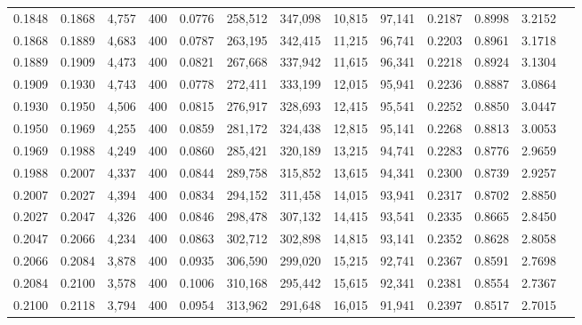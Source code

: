 \begin{tabular}{rrrrrrrrrrrrr}
0.1848 & 0.1868 &  4,757 &   400 &                                     0.0776 & 258,512 & 347,098 &  10,815 &  97,141 & 0.2187 & 0.8998 & 3.2152 \\
0.1868 & 0.1889 &  4,683 &   400 &                                     0.0787 & 263,195 & 342,415 &  11,215 &  96,741 & 0.2203 & 0.8961 & 3.1718 \\
0.1889 & 0.1909 &  4,473 &   400 &                                     0.0821 & 267,668 & 337,942 &  11,615 &  96,341 & 0.2218 & 0.8924 & 3.1304 \\
0.1909 & 0.1930 &  4,743 &   400 &                                     0.0778 & 272,411 & 333,199 &  12,015 &  95,941 & 0.2236 & 0.8887 & 3.0864 \\
0.1930 & 0.1950 &  4,506 &   400 &                                     0.0815 & 276,917 & 328,693 &  12,415 &  95,541 & 0.2252 & 0.8850 & 3.0447 \\
0.1950 & 0.1969 &  4,255 &   400 &                                     0.0859 & 281,172 & 324,438 &  12,815 &  95,141 & 0.2268 & 0.8813 & 3.0053 \\
0.1969 & 0.1988 &  4,249 &   400 &                                     0.0860 & 285,421 & 320,189 &  13,215 &  94,741 & 0.2283 & 0.8776 & 2.9659 \\
0.1988 & 0.2007 &  4,337 &   400 &                                     0.0844 & 289,758 & 315,852 &  13,615 &  94,341 & 0.2300 & 0.8739 & 2.9257 \\
0.2007 & 0.2027 &  4,394 &   400 &                                     0.0834 & 294,152 & 311,458 &  14,015 &  93,941 & 0.2317 & 0.8702 & 2.8850 \\
0.2027 & 0.2047 &  4,326 &   400 &                                     0.0846 & 298,478 & 307,132 &  14,415 &  93,541 & 0.2335 & 0.8665 & 2.8450 \\
0.2047 & 0.2066 &  4,234 &   400 &                                     0.0863 & 302,712 & 302,898 &  14,815 &  93,141 & 0.2352 & 0.8628 & 2.8058 \\
0.2066 & 0.2084 &  3,878 &   400 &                                     0.0935 & 306,590 & 299,020 &  15,215 &  92,741 & 0.2367 & 0.8591 & 2.7698 \\
0.2084 & 0.2100 &  3,578 &   400 &                                     0.1006 & 310,168 & 295,442 &  15,615 &  92,341 & 0.2381 & 0.8554 & 2.7367 \\
0.2100 & 0.2118 &  3,794 &   400 &                                     0.0954 & 313,962 & 291,648 &  16,015 &  91,941 & 0.2397 & 0.8517 & 2.7015 \\

\end{tabular}
